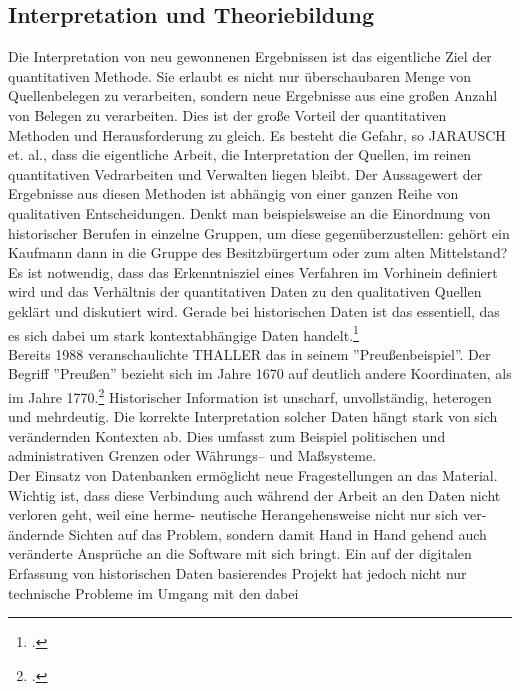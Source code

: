 \documentclass[12pt,a4paper]{article}
\begin{document}
\subsection{Interpretation und Theoriebildung}

Die Interpretation von neu gewonnenen Ergebnissen ist das eigentliche Ziel der quantitativen Methode. Sie erlaubt es nicht nur überschaubaren Menge von Quellenbelegen zu verarbeiten, sondern neue Ergebnisse aus eine großen Anzahl von Belegen zu verarbeiten. Dies ist der große Vorteil der quantitativen Methoden und Herausforderung zu gleich. Es besteht die Gefahr, so JARAUSCH et. al., dass die eigentliche Arbeit, die Interpretation der Quellen, im reinen quantitativen Vedrarbeiten und Verwalten liegen bleibt. Der Aussagewert der Ergebnisse aus diesen Methoden ist abhängig von einer ganzen Reihe von qualitativen Entscheidungen. Denkt man beispielsweise an die Einordnung von historischer Berufen in einzelne Gruppen, um diese gegenüberzustellen: gehört ein Kaufmann dann in die Gruppe des Besitzbürgertum oder zum alten Mittelstand? Es ist notwendig, dass das Erkenntnisziel eines Verfahren im Vorhinein definiert wird und das Verhältnis der quantitativen Daten zu den qualitativen Quellen geklärt und diskutiert wird. Gerade bei historischen Daten ist das essentiell, das es sich dabei um stark kontextabhängige Daten handelt.\footcite[][S.182-193]{jarausch1985quantitative}
\\
Bereits 1988 veranschaulichte THALLER das in seinem ''Preußenbeispiel''. Der Begriff ''Preußen'' bezieht sich im Jahre 1670 auf deutlich andere Koordinaten, als im Jahre 1770.\footcite[][S.264-266]{thaller2017historical} Historischer Information ist unscharf, unvollständig, heterogen und mehrdeutig. Die korrekte Interpretation solcher Daten hängt stark von sich verändernden Kontexten ab. Dies umfasst zum Beispiel politischen und administrativen Grenzen oder Währungs-- und Maßsysteme.
\\
Der Einsatz von Datenbanken ermöglicht neue Fragestellungen an das Material. Wichtig ist, dass 
diese Verbindung auch während der Arbeit an 
den Daten nicht verloren geht, weil eine herme-
neutische Herangehensweise nicht nur sich ver-
ändernde Sichten auf das Problem, sondern 
damit Hand in Hand gehend auch veränderte 
Ansprüche an die Software mit sich bringt. 
Ein auf der digitalen Erfassung von historischen 
Daten basierendes Projekt hat jedoch nicht nur 
technische Probleme im Umgang mit den dabei 
\end{document}
